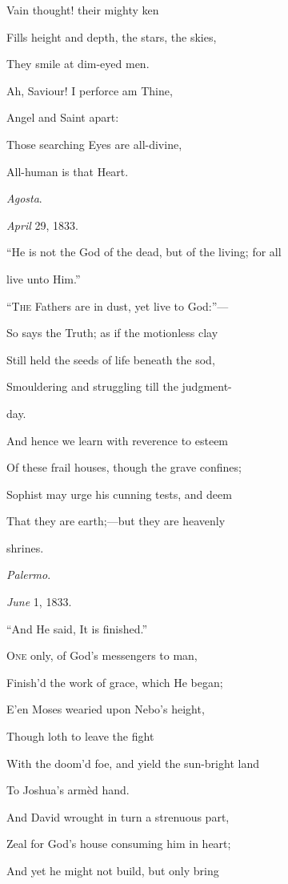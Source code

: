 Vain thought! their mighty ken

Fills height and depth, the stars, the skies,

They smile at dim-eyed men.

Ah, Saviour! I perforce am Thine,

Angel and Saint apart:

Those searching Eyes are all-divine,

All-human is that Heart.

\emph{Agosta}.

\emph{April} 29, 1833.


``He is not the God of the dead, but of the
living; for all

live unto Him.''

``T\textsc{he} Fathers are in dust, yet live to God:''—

So says the Truth; as if the motionless
clay

Still held the seeds of life beneath the sod,

Smouldering and struggling till the
judgment-

day.

And hence we learn with reverence to esteem

Of these frail houses, though the grave
confines;

Sophist may urge his cunning tests, and deem

That they are earth;—but they are
heavenly

shrines.

\emph{Palermo}.

\emph{June} 1, 1833.


``And He said, It is finished.''

O\textsc{ne} only, of God's messengers to man,

Finish'd the work of grace, which He began;

E'en Moses wearied upon Nebo's height,

Though loth to leave the
fight

With the doom'd foe, and yield the sun-bright land

To Joshua's armèd hand.

And David wrought in turn a strenuous part,

Zeal for God's house consuming him in heart;

And yet he might not build, but only bring

